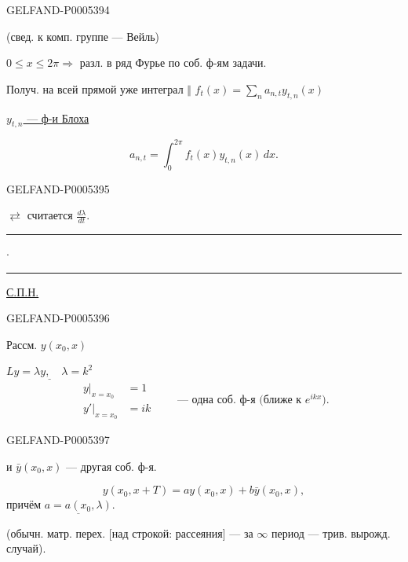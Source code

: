 \begin{GelfandAdjacentEvidence}{GELFAND-P000539}{4}


(свед. к комп. группе — Вейль)

$0\le x\le2\pi\Rightarrow$ разл. в ряд Фурье по соб. ф-ям задачи.

Получ. на всей прямой уже интеграл \(\big\Vert\)
\(\displaystyle f_t(x)=\sum_n a_{n,t}y_{t,n}(x)\)

\hfill\uline{\mbox{$y_{t,n}$} — ф-и Блоха}\par
\[
a_{n,t}=\int_0^{2\pi}f_t(x)y_{t,n}(x)\,dx.
\]
\end{GelfandAdjacentEvidence}
\begin{GelfandAdjacentEvidence}{GELFAND-P000539}{5}


\(\rightleftarrows\) считается \(\displaystyle\frac{d\lambda}{dt}\).

\hfill\rule{1.1cm}{.35pt}\enspace\(\cdot\)\enspace\rule{1.55cm}{.35pt}\par

\uline{С.П.Н.}
\end{GelfandAdjacentEvidence}
\begin{GelfandAdjacentEvidence}{GELFAND-P000539}{6}


Рассм. \(y(x_0,x)\)

\(\underline{Ly=\lambda y,\quad\lambda=k^2}\)
\[
\begin{aligned}
y|_{x=x_0}&=1\\
y'|_{x=x_0}&=ik
\end{aligned}
\qquad\text{— одна соб. ф-я (ближе к }e^{ikx}\text{).}
\]
\end{GelfandAdjacentEvidence}
\begin{GelfandAdjacentEvidence}{GELFAND-P000539}{7}

и \(\bar y(x_0,x)\) — другая соб. ф-я.

\[
y(x_0,x+T)=ay(x_0,x)+b\bar y(x_0,x),
\]
причём \(\underline{a=a(x_0,\lambda)}\).

(обычн. матр. перех. [над строкой: рассеяния] — за \(\infty\) период — трив. вырожд. случай).
\end{GelfandAdjacentEvidence}

